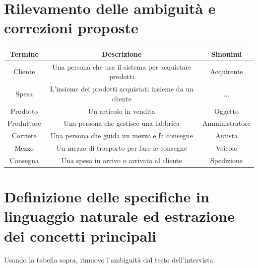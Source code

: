 \documentclass[a4paper,12pt]{report}
\begin{document}
\section{Rilevamento delle ambiguità e correzioni proposte}
\begin{center}
    \begin{tabular}{ | c | c | c |} 
    \hline
    Termine&Descrizione&Sinonimi \\
    \hline
    Cliente&Una persona che usa il sistema per acquistare prodotti&Acquirente \\
	\hline
	Spesa&L'insieme dei prodotti acquistati insieme da un cliente&...\\
	\hline
	Prodotto&Un articolo in vendita&Oggetto\\
	\hline
	Produttore&Una persona che gestisce una fabbrica&Amministratore\\
	\hline
	Corriere&Una persona che guida un mezzo e fa consegne&Autista\\
	\hline
	Mezzo&Un mezzo di trasporto per fare le consegne&Veicolo\\
	\hline
	Consegna&Una spesa in arrivo o arrivata al cliente&Spedizione\\
	\hline
    \end{tabular}
\end{center}
\section{Definizione delle specifiche in linguaggio naturale ed estrazione dei concetti principali}
Usando la tabella sopra, rimuovo l'ambiguità dal testo dell'intervista.\\
\end{document}
